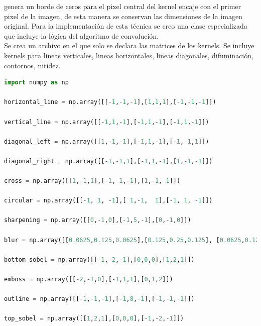 \documentclass{article}
\begin{document}
genera un borde de ceros para el pixel central del kernel encaje con el primer pixel de la imagen, de esta manera se conservan las dimensiones de la imagen original.
Para la implementación de esta técnica se creo una clase especializada que incluye la lógica del algoritmo de convolución. \\
Se crea un archivo en el que solo se declara las matrices de los kernels. Se incluye kernels para lineas verticales, lineas horizontales, lineas diagonales, difuminación, contornos, nitidez. \\
\begin{lstlisting}[language=python]
import numpy as np

horizontal_line = np.array([[-1,-1,-1],[1,1,1],[-1,-1,-1]])

vertical_line = np.array([[-1,1,-1],[-1,1,-1],[-1,1,-1]])

diagonal_left = np.array([[1,-1,-1],[-1,1,-1],[-1,-1,1]])

diagonal_right = np.array([[-1,-1,1],[-1,1,-1],[1,-1,-1]])

cross = np.array([[1,-1,1],[-1, 1,-1],[1,-1, 1]])

circular = np.array([[-1, 1, -1],[ 1,-1,  1],[-1, 1, -1]])

sharpening = np.array([[0,-1,0],[-1,5,-1],[0,-1,0]])

blur = np.array([[0.0625,0.125,0.0625],[0.125,0.25,0.125], [0.0625,0.125,0.0625]])

bottom_sobel = np.array([[-1,-2,-1],[0,0,0],[1,2,1]])

emboss = np.array([[-2,-1,0],[-1,1,1],[0,1,2]])

outline = np.array([[-1,-1,-1],[-1,8,-1],[-1,-1,-1]])

top_sobel = np.array([[1,2,1],[0,0,0],[-1,-2,-1]])

\end{lstlisting}
\end{document}
